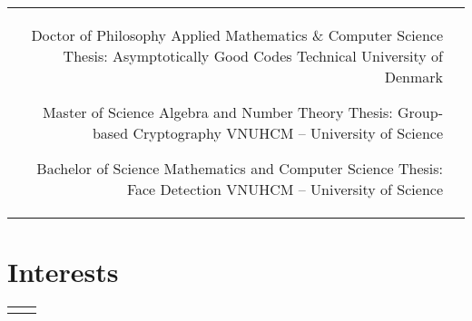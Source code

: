 \documentclass[11pt]{article} %
\begin{document}
\begin{paracol}{2}
\begin{supertabular}{rl} %

	
	{Doctor of Philosophy} %
	{Applied Mathematics \& Computer Science} %
    {Thesis: Asymptotically Good Codes} %
	{Technical University of Denmark} %
	
	
	{Master of Science} %
	{Algebra and Number Theory} %
    {Thesis: Group-based Cryptography} %
	{VNUHCM -- University of Science} %
	
	
	{Bachelor of Science} %
	{Mathematics and Computer Science} %
    {Thesis: Face Detection} %
	{VNUHCM -- University of Science} %
	

\end{supertabular}


\section{Interests}

\begin{supertabular}{rl} %
	

\end{supertabular}    


\medskip %



\end{paracol}
\end{document}
